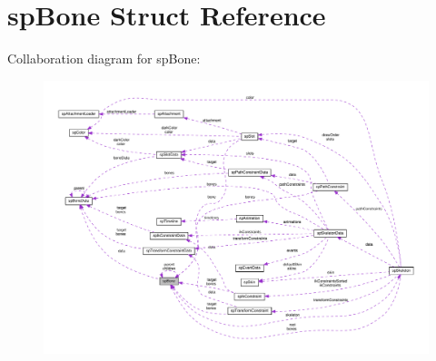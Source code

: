 \hypertarget{structspBone}{}\section{sp\+Bone Struct Reference}
\label{structspBone}


Collaboration diagram for sp\+Bone\+:
\nopagebreak
\begin{figure}[H]
\begin{center}
\leavevmode
\includegraphics[width=350pt]{structspBone__coll__graph}
\end{center}
\end{figure}
